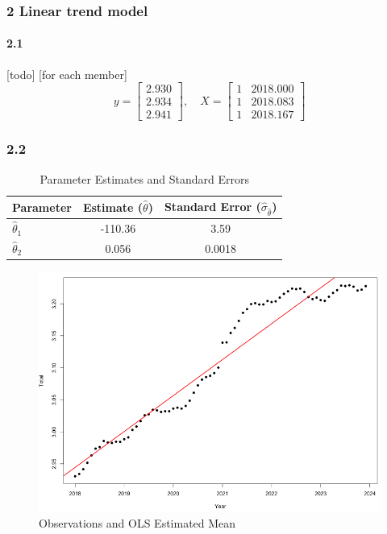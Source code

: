 \documentclass[
]{article}
\begin{document}
\subsubsection{2 Linear trend model}\label{linear-trend-model}

\paragraph{2.1}\label{section-2}

{[}todo{]} {[}for each member{]} \[
y = \begin{bmatrix}
2.930 \\
2.934 \\
2.941
\end{bmatrix},
\quad
X = \begin{bmatrix}
1 & 2018.000 \\
1 & 2018.083 \\
1 & 2018.167
\end{bmatrix}
\]

\subsubsection{2.2}\label{section-3}

\begin{table}[h]
\centering
\begin{tabular}{|l|c|c|}
\hline
\textbf{Parameter} & \textbf{Estimate} ($\hat{\theta}$) & \textbf{Standard Error} ($\hat{\sigma}_{\hat{\theta}}$) \\
\hline
$\hat{\theta}_1$ & -110.36 & 3.59 \\
\hline
$\hat{\theta}_2$ & 0.056 & 0.0018 \\
\hline
\end{tabular}
\caption{Parameter Estimates and Standard Errors}
\label{tab:parameters}
\end{table}

\begin{figure}

{\centering \includegraphics[width=0.7\linewidth]{plots/estimated_mean} 

}

\caption{Observations and OLS Estimated Mean}\label{fig:unnamed-chunk-2}
\end{figure}
\end{document}
